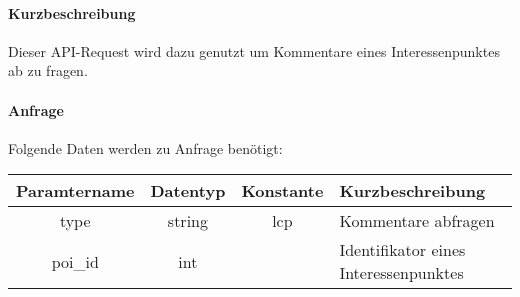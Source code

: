\paragraph{Kurzbeschreibung}Dieser API-Request wird dazu genutzt um Kommentare eines Interessenpunktes ab zu fragen.
\paragraph{Anfrage}Folgende Daten werden zu Anfrage benötigt:
\begin{table}[H]
	\begin{tabular}{|c|c|c|p{6.5cm}|}
		\hline
		\textbf{Paramtername} & \textbf{Datentyp} & \textbf{Konstante} & \textbf{Kurzbeschreibung}                                                                                               \\ \hline
		type                & string            & lcp                & Kommentare abfragen \\ \hline
		poi\_id             & int               &                    & Identifikator eines Interessenpunktes \\ \hline
	\end{tabular}
\end{table}
